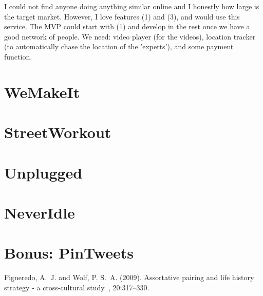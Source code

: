 \documentclass[DIV=calc, paper=a4, fontsize=11pt, twocolumn]{scrartcl}	 %
\begin{document}
I could not find anyone doing anything similar online and I honestly how large is the target market. However, I love features (1) and (3), and would use this service. The MVP could start with (1) and develop in the rest once we have a good network of people. We need: video player (for the videos), location tracker (to automatically chase the location of the 'experts'), and some payment function.

\section*{WeMakeIt}
\lipsum[8-12]

\section*{StreetWorkout}
\lipsum[1-5]

\section*{Unplugged}
\lipsum[2-7]

\section*{NeverIdle}
\lipsum[5]

\section*{Bonus: PinTweets}
\lipsum[3-9]



\begin{thebibliography}{99} %

Figueredo, A.~J. and Wolf, P. S.~A. (2009).
\newblock Assortative pairing and life history strategy - a cross-cultural
  study.
, 20:317--330.
 
\end{thebibliography}

\end{document}

